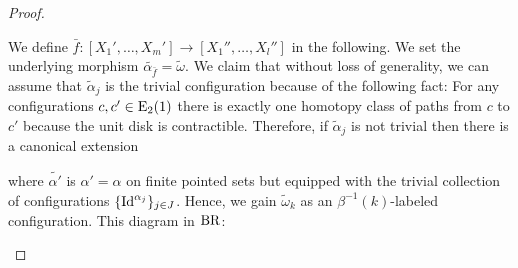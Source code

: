 \begin{proof}
\begin{enumerate}
\begin{center}
        \end{center}
        We define $\bar{f} \colon  [X_1', \dots, X_m'] \to [X_1'', \dots,
        X_l'']$ in the following. We set the underlying morphism
        $\widetilde{\alpha_{\bar{f}}} = \widetilde{\omega}$. We claim that  
        without loss of generality, we can assume that $\widetilde{\alpha}_j$ is
        the trivial configuration because of the following fact: For any
        configurations $c, c' \in \operatorname{E}_2(1)$ there is exactly one homotopy class
        of paths from $c$ to $c'$ because the unit disk is contractible.
        Therefore, if $\widetilde{\alpha}_j$ is not trivial then there is a
        canonical extension 
        \begin{center}
        \end{center}
        where $\widetilde{\alpha'}$ is $\alpha' = \alpha$ on finite pointed sets
        but equipped with the trivial collection of configurations
        $\{\operatorname{Id}^{\alpha_j}\}_{j \in J}$. Hence, we gain $\widetilde{\omega}_k$ as
        an $\beta^{-1}(k)$-labeled configuration. This diagram in $\operatorname{BR}$:
        \begin{center}
\end{center}
\end{enumerate}
\end{proof}

